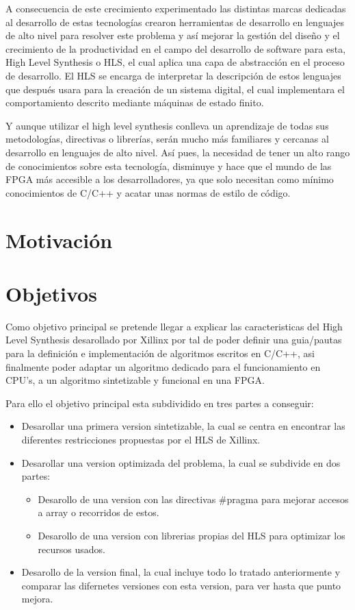 \documentclass[11pt,spanish,listoffigures,listoftables]{tfgetsinf}
\begin{document}
   A consecuencia de este crecimiento experimentado las distintas marcas
   dedicadas al desarrollo de estas tecnolog\'ias crearon herramientas de
   desarrollo en lenguajes de alto nivel para resolver este problema y as\'i
   mejorar la gesti\'on del dise\~{n}o y el crecimiento de la productividad en
   el campo del desarrollo de software para esta, High Level Synthesis o HLS, el
   cual aplica una capa de abstracción en el proceso de desarrollo. El HLS se
   encarga de interpretar la descripci\'on de estos lenguajes que despu\'es
   usara para la creaci\'on de un sistema digital, el cual implementara el
   comportamiento descrito mediante m\'aquinas de estado finito.
   
   Y aunque utilizar el high level synthesis conlleva un aprendizaje de todas sus
   metodologías, directivas o librerías, serán mucho m\'as familiares y cercanas
   al desarrollo en lenguajes de alto nivel. Así pues, la necesidad de tener un
   alto rango de conocimientos sobre esta tecnología, disminuye y hace que el
   mundo de las FPGA m\'as accesible a los desarrolladores, ya que solo necesitan
   como mínimo conocimientos de C/C++ y acatar unas normas de estilo de c\'odigo.

\newpage{}
\section{Motivaci\'on}
\section{Objetivos}

   Como objetivo principal se pretende llegar a explicar las caracteristicas del
   High Level Synthesis desarollado por Xillinx por tal de poder definir una
   guia/pautas para la definición e implementación de algoritmos escritos en
   C/C++, asi finalmente poder adaptar un algoritmo dedicado para el
   funcionamiento en CPU's, a un algoritmo sintetizable y funcional en una FPGA.
   
   Para ello el objetivo principal esta subdividido en tres partes a conseguir:
   \begin{itemize}
      \item Desarollar una primera version sintetizable, la cual se centra en
      encontrar las diferentes restricciones propuestas por el HLS de Xillinx.
      \item Desarollar una version optimizada del problema, la cual se subdivide
      en dos partes:
      \begin{itemize}
         \item Desarollo de una version con las directivas \#pragma para mejorar
         accesos a array o recorridos de estos.
         \item Desarollo de una version con librerias propias del HLS para
         optimizar los recursos usados.
      \end{itemize}
      \item Desarollo de la version final, la cual incluye todo lo tratado
      anteriormente y comparar las difernetes versiones con esta version, para
      ver hasta que punto mejora.  
   \end{itemize}
\end{document}
